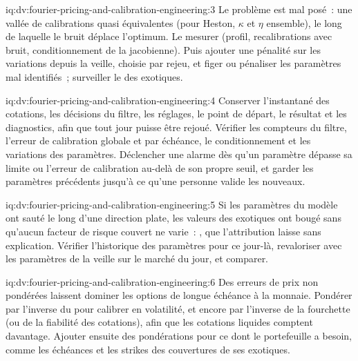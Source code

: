 \begin{solution}{iq:dv:fourier-pricing-and-calibration-engineering:3}
Le problème est mal posé~: une vallée de calibrations quasi équivalentes (pour Heston, $\kappa$ et $\eta$ ensemble), le long de laquelle le bruit déplace l'optimum. Le mesurer
(profil, recalibrations avec bruit, conditionnement de la jacobienne). Puis ajouter une pénalité sur les variations depuis la veille, choisie par rejeu, et figer ou pénaliser
les paramètres mal identifiés~; surveiller le  des exotiques.
\end{solution}

\begin{solution}{iq:dv:fourier-pricing-and-calibration-engineering:4}
Conserver l'instantané des cotations, les décisions du filtre, les réglages, le point de départ, le résultat et les diagnostics, afin que tout jour puisse être rejoué. Vérifier les
compteurs du filtre, l'erreur de calibration globale et par échéance, le conditionnement et les variations des paramètres. Déclencher une alarme dès qu'un paramètre dépasse sa limite ou
l'erreur de calibration au-delà de son propre seuil, et garder les paramètres précédents jusqu'à ce qu'une personne valide les nouveaux.
\end{solution}

\begin{solution}{iq:dv:fourier-pricing-and-calibration-engineering:5}
Si les paramètres du modèle ont sauté le long d'une direction plate, les valeurs des exotiques ont bougé sans qu'aucun facteur de risque couvert ne varie~: , que
l'attribution laisse sans explication. Vérifier l'historique des paramètres pour ce jour-là, revaloriser avec les paramètres de la veille sur le marché du jour, et comparer.
\end{solution}

\begin{solution}{iq:dv:fourier-pricing-and-calibration-engineering:6}
Des erreurs de prix non pondérées laissent dominer les options de longue échéance à la monnaie. Pondérer par l'inverse du  pour calibrer en volatilité, et encore par l'inverse
de la fourchette (ou de la fiabilité des cotations), afin que les cotations liquides comptent davantage. Ajouter ensuite des pondérations pour ce dont le portefeuille a besoin, comme les échéances et les strikes des
couvertures de ses exotiques.
\end{solution}

